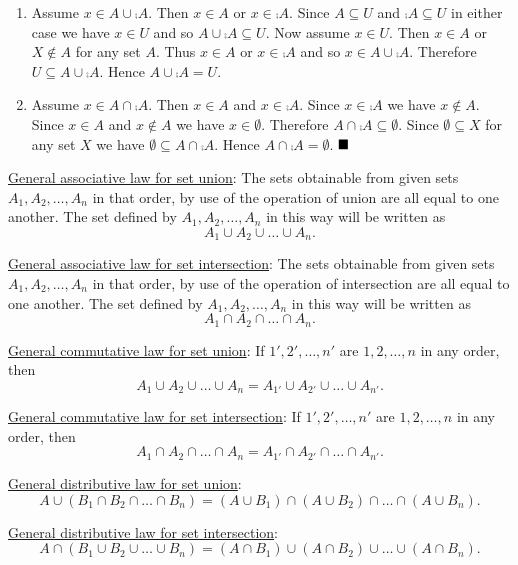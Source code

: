 \documentclass[12pt]{book}
\begin{document}
\begin{enumerate}
\renewcommand{\labelenumi}{\arabic{enumi}.}
\setcounter{enumi}{4}
\item Assume $x \in A \cup \comp{A}$. Then $x \in A$ or $x \in \comp{A}$. Since $A \subseteq U$ and $\comp{A} \subseteq U$ in either case we have $x \in U$ and so $A \cup \comp{A} \subseteq U$. Now assume $x \in U$. Then $x \in A$ or $X \notin A$ for any set $A$. Thus $x \in A$ or $x \in \comp{A}$ and so $x \in A \cup \comp{A}$. Therefore $U \subseteq A \cup \comp{A}$. Hence $A \cup \comp{A} = U$.
\renewcommand{\labelenumi}{\arabic{enumi}'.}
\setcounter{enumi}{4}
\item Assume $x \in A \cap \comp{A}$. Then $x \in A$ and $x \in \comp{A}$. Since $x \in \comp{A}$ we have $x \notin A$. Since $x \in A$ and $x \notin A$ we have $x \in \emptyset$. Therefore $A \cap \comp{A} \subseteq \emptyset$. Since $\emptyset \subseteq X$ for any set $X$ we have $\emptyset \subseteq A \cap \comp{A}$. Hence $A \cap \comp{A} = \emptyset$. $\qed$
\end{enumerate}

\underline{General associative law for set union}: The sets obtainable from given sets $A_1, A_2, \dots, A_n$ in that order, by use of the operation of union are all equal to one another. The set defined by $A_1, A_2, \dots, A_n$ in this way will be written as $$A_1 \cup A_2 \cup \dots \cup A_n.$$

\underline{General associative law for set intersection}: The sets obtainable from given sets $A_1, A_2, \dots, A_n$ in that order, by use of the operation of intersection are all equal to one another. The set defined by $A_1, A_2, \dots, A_n$ in this way will be written as $$A_1 \cap A_2 \cap \dots \cap A_n.$$

\underline{General commutative law for set union}: If $1',2',\dots,n'$ are $1,2,\dots,n$ in any order, then $$A_1 \cup A_2 \cup \dots \cup A_n = A_{1'} \cup A_{2'} \cup \dots \cup A_{n'}.$$

\underline{General commutative law for set intersection}: If $1',2',\dots,n'$ are $1,2,\dots,n$ in any order, then $$A_1 \cap A_2 \cap \dots \cap A_n = A_{1'} \cap A_{2'} \cap \dots \cap A_{n'}.$$

\underline{General distributive law for set union}: $$A \cup (B_1 \cap B_2 \cap \dots \cap B_n) = (A \cup B_1) \cap (A \cup B_2) \cap \dots \cap (A \cup B_n).$$

\underline{General distributive law for set intersection}: $$A \cap (B_1 \cup B_2 \cup \dots \cup B_n) = (A \cap B_1) \cup (A \cap B_2) \cup \dots \cup (A \cap B_n).$$
\end{document}
